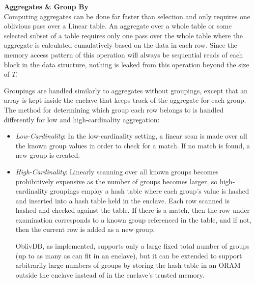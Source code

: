 \documentclass[conference]{IEEEtran}
\def\name/{OblivDB}
\begin{document}
\medskip \noindent \textbf{Aggregates \& Group By}\\
Computing aggregates can be done far faster than selection and only requires one oblivious pass over a Linear table. An aggregate over a whole table or some selected subset of a table requires only one pass over the whole table where the aggregate is calculated cumulatively based on the data in each row. Since the memory access pattern of this operation will always be sequential reads of each block in the data structure, nothing is leaked from this operation beyond the size of $T$. 

Groupings are handled similarly to aggregates without groupings, except that an array is kept inside the enclave that keeps track of the aggregate for each group. The method for determining which group each row belongs to is handled differently for low and high-cardinality aggregation:
\begin{itemize}
\item \textit{Low-Cardinality}: In the low-cardinality setting, a linear scan is made over all the known group values in order to check for a match. If no match is found, a new group is created. 

\item \textit{High-Cardinality}: Linearly scanning over all known groups becomes prohibitively expensive as the number of groups becomes larger, so high-cardinality groupings employ a hash table where each group's value is hashed and inserted into a hash table held in the enclave. Each row scanned is hashed and checked against the table. If there is a match, then the row under examination corresponds to a known group referenced in the table, and if not, then the current row is added as a new group. 

\name/, as implemented, supports only a large fixed total number of groups (up to as many as can fit in an enclave), but it can be extended to support arbitrarily large numbers of groups by storing the hash table in an ORAM outside the enclave instead of in the enclave's trusted memory. 
\end{itemize}
\end{document}
